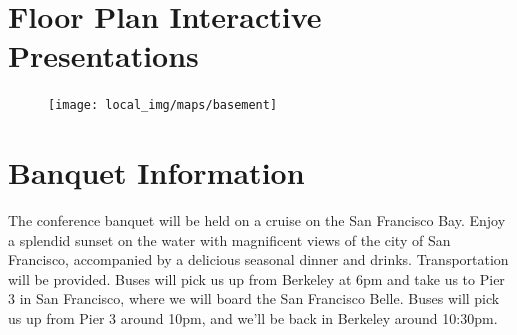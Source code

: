  \section{Floor Plan Interactive Presentations}

\begin{figure}[h!]
\center
\texttt{[image: local\_img/maps/basement]}
\end{figure}


 \section{Banquet Information}
The conference banquet will be held on a cruise on the San Francisco Bay. Enjoy a splendid sunset on the water with magnificent views of the city of San Francisco, accompanied by a
delicious seasonal dinner and drinks. Transportation will be provided. Buses will pick us up from Berkeley at 6pm and take us to Pier 3 in San Francisco, where we will board the San Francisco Belle. Buses will pick us up from Pier 3 around 10pm, and we'll be back in Berkeley
around 10:30pm.







\setlength\fboxrule{0pt}

